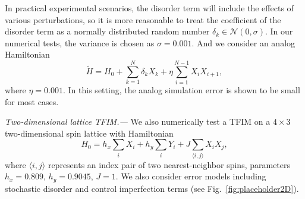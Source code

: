 \documentclass[12pt]{article}
\begin{document}
In practical experimental scenarios, the disorder term will include the effects of various perturbations, so it is more reasonable to treat the coefficient of the disorder term as a normally distributed random number $\delta_k\in\mathcal N(0,\sigma)$. In our numerical tests, the variance is chosen as $\sigma=0.001$. And we consider an analog Hamiltonian  
\begin{equation}
    \widetilde{H}=H_0+\sum_{k=1}^N\delta_kX_k+\eta\sum_{i=1}^{N-1}X_iX_{i+1},
\end{equation}
where $\eta=0.001$. In this setting, the analog simulation error is shown to be small for most cases.



\emph{Two-dimensional lattice TFIM.---}
We also numerically test a TFIM on a $4\times 3$ two-dimensional spin lattice with Hamiltonian
\begin{equation}
    H_0=h_x\sum_i X_i+h_y\sum_iY_i+J\sum_{\langle i,j\rangle}X_iX_j,
\end{equation}
where $\langle
{i,j}\rangle$ represents an index pair of two nearest-neighbor spins, parameters $h_x=0.809$, $h_y=0.9045$, $J=1$. We also consider error models including stochastic disorder and control imperfection terms (see Fig.~\ref{fig:placeholder2D}).









    
    
    
\end{document}
